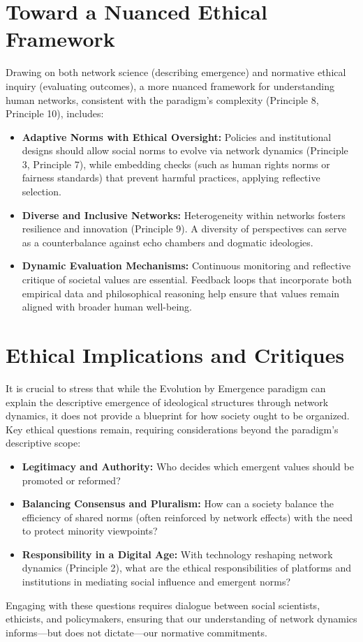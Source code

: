 \section{Toward a Nuanced Ethical Framework}
Drawing on both network science (describing emergence) and normative ethical inquiry (evaluating outcomes), a more nuanced framework for understanding human networks, consistent with the paradigm's complexity (Principle 8, Principle 10), includes:
\begin{itemize}
    \item \textbf{Adaptive Norms with Ethical Oversight:} Policies and institutional designs should allow social norms to evolve via network dynamics (Principle 3, Principle 7), while embedding checks (such as human rights norms or fairness standards) that prevent harmful practices, applying reflective selection.
    \item \textbf{Diverse and Inclusive Networks:} Heterogeneity within networks fosters resilience and innovation (Principle 9). A diversity of perspectives can serve as a counterbalance against echo chambers and dogmatic ideologies.
    \item \textbf{Dynamic Evaluation Mechanisms:} Continuous monitoring and reflective critique of societal values are essential. Feedback loops that incorporate both empirical data and philosophical reasoning help ensure that values remain aligned with broader human well-being.
\end{itemize} %

\section{Ethical Implications and Critiques}
It is crucial to stress that while the Evolution by Emergence paradigm can explain the descriptive emergence of ideological structures through network dynamics, it does not provide a blueprint for how society ought to be organized. Key ethical questions remain, requiring considerations beyond the paradigm's descriptive scope:
\begin{itemize}
    \item \textbf{Legitimacy and Authority:} Who decides which emergent values should be promoted or reformed?
    \item \textbf{Balancing Consensus and Pluralism:} How can a society balance the efficiency of shared norms (often reinforced by network effects) with the need to protect minority viewpoints?
    \item \textbf{Responsibility in a Digital Age:} With technology reshaping network dynamics (Principle 2), what are the ethical responsibilities of platforms and institutions in mediating social influence and emergent norms?
\end{itemize}
Engaging with these questions requires dialogue between social scientists, ethicists, and policymakers, ensuring that our understanding of network dynamics informs—but does not dictate—our normative commitments. %


